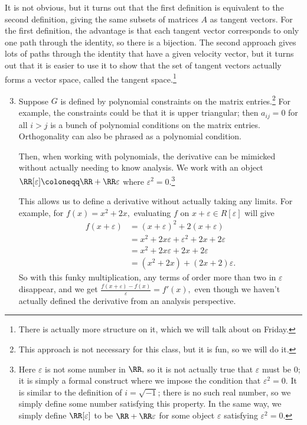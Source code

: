 It is not obvious, but it turns out that the first definition is equivalent to the second definition, giving the same subsets of matrices $A$ as tangent vectors. For the first definition, the advantage is that each tangent vector corresponds to only one path through the identity, so there is a bijection. The second approach gives lots of paths through the identity that have a given velocity vector, but it turns out that it is easier to use it to show that the set of tangent vectors actually forms a vector space, called the tangent space.\footnote{There is actually more structure on it, which we will talk about on Friday.}

\begin{enumerate} %
\setcounter{enumi}{2}
    \item Suppose $G$ is defined by polynomial constraints on the matrix entries.\footnote{This approach is not necessary for this class, but it is fun, so we will do it.} For example, the constraints could be that it is upper triangular; then $a_{ij} = 0$ for all $i > j$ is a bunch of polynomial conditions on the matrix entries. Orthogonality can also be phrased as a polynomial condition.
    
    Then, when working with polynomials, the derivative can be mimicked without actually needing to know analysis. We work with an object $\RR[\varepsilon] \coloneqq \RR + \RR \varepsilon$ where $\varepsilon^2 = 0.$\footnote{Here $\varepsilon$ is not some number in $\RR,$ so it is not actually true that $\varepsilon$ must be 0; it is simply a formal construct where we impose the condition that $\varepsilon^2 = 0.$ It is similar to the definition of $i = \sqrt{-1}$; there is no such real number, so we simply define some number satisfying this property. In the same way, we simply define $\RR[\varepsilon]$ to be $\RR + \RR \varepsilon$ for some object $\varepsilon$ satisfying $\varepsilon^2 = 0.$} 
    
    This allows us to define a derivative without actually taking any limits. For example, for $f(x)  = x^2 + 2x,$ evaluating $f$ on $x + \varepsilon \in R[\varepsilon]$ will give
    \begin{align*}
           f(x + \varepsilon) &= (x + \varepsilon)^2 + 2(x + \varepsilon) \\
           &= x^2 + 2x\varepsilon + \varepsilon^2 + 2x + 2\varepsilon\\
           &= x^2 + 2x\varepsilon + 2x + 2\varepsilon\\
           &= (x^2 + 2x) + (2x + 2)\varepsilon.
    \end{align*}
    So with this funky multiplication, any terms of order more than two in $\varepsilon$ disappear, and we get $\frac{f(x + \varepsilon) - f(x)}{\varepsilon} = f'(x),$ even though we haven't actually defined the derivative from an analysis perspective. 
\end{enumerate}

